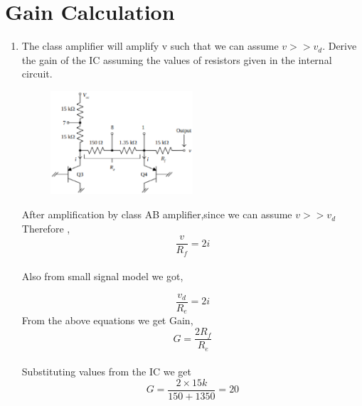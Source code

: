 \documentclass[journal,12pt,twocolumn]{IEEEtran}
\renewcommand\thesection{\arabic{section}}
\begin{document}
\section{Gain Calculation}
\begin{enumerate}[label=\thesection.\arabic*,ref=\thesection.\theenumi]
\item The class amplifier will amplify v such that we can assume $v>>v_{d}$. Derive the gain of the IC assuming the values of resistors given in the internal circuit.\\
\solution
\begin{figure}[!ht]
  \centering
 
    \includegraphics[width=0.5\textwidth]{./figs/LM3865.eps}

\caption{}
\label{fig:6}
\end{figure}

After amplification by class AB amplifier,since we can assume $v>>v_{d}$ \\
Therefore , $$\frac{v}{R_{f}}=2i$$ \\
Also from small signal model we got,

   $$ \frac{v_{d}}{R_{e}}=2i
$$
From the above equations we get Gain, $$G=\frac{2 R_{f}}{R_{e}}$$\\
Substituting values from the IC we get $$G=\frac{2 \times 15k}{150+1350} =20$$    

\end{enumerate}
\end{document}
